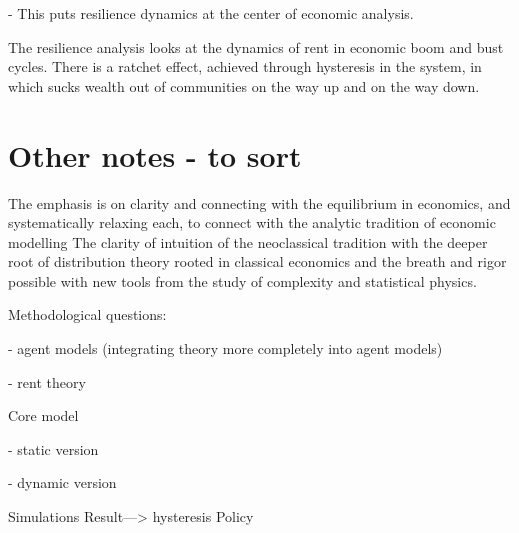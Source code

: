 - This puts resilience dynamics at the center of economic analysis.

The resilience analysis looks at the dynamics of rent in economic boom and bust cycles.
There is a ratchet effect, achieved through hysteresis in the system, in which sucks wealth out of communities on the way up and on the way down. %


\section{Other notes - to sort}


The emphasis is on clarity and connecting with the equilibrium in economics, and systematically relaxing each, to connect with the analytic tradition of economic modelling
The clarity of intuition of the neoclassical tradition with the deeper root of distribution theory rooted in classical economics and the breath and rigor possible with new tools from the study of complexity and statistical physics.

Methodological questions: 

    - agent models (integrating theory more completely into agent models)
    
    - rent theory

Core model

    - static version
    
    - dynamic version

Simulations
Result---> hysteresis
Policy

